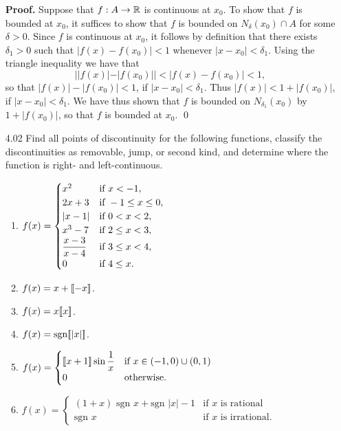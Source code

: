 \begin{enumerate}
      \textbf{Proof.} Suppose that $f : A \rightarrow \mathbb{R}$ is continuous at
      $x_0$. To show that $f$ is bounded at $x_0$, it suffices to show that
      $f$ is bounded on $N_{\delta}(x_0) \cap A$ for some $\delta > 0$. Since
      $f$ is continuous at $x_0$, it follows by definition that there exists
      $\delta_1 > 0$ such that $|f(x) - f(x_0)| < 1$ whenever
      $|x - x_0| < \delta_1$. Using the triangle inequality we have that
      $$||f(x)| - |f(x_0)|| < |f(x) - f(x_0)| < 1,$$
      so that $|f(x)| - |f(x_0)| < 1$, if $|x - x_0| < \delta_1$. Thus
      $|f(x)| < 1 + |f(x_0)|$, if $|x - x_0| < \delta_1$. We have thus shown
      that $f$ is bounded on $N_{\delta_1}(x_0)$ by $1 + |f(x_0)|$, so that
      $f$ is bounded at $x_0$. \qed
   \item[4.02] Find all points of discontinuity for the following functions,
               classify the discontinuities as removable, jump, or second kind,
               and determine where the function is right- and left-continuous.
               \begin{enumerate}
                  \item $f(x) = \begin{cases}
                           x^2                 & \text{if } x < -1, \\
                           2x + 3              & \text{if } -1 \le x \le 0,\\
                           |x - 1|             & \text{if } 0 < x < 2, \\
                           x^3 - 7             & \text{if } 2 \le x < 3, \\
                         \displaystyle\frac{x - 3}{x - 4} & \text{if } 3 \le x < 4, \\
                           0                   & \text{if } 4 \le x.
                        \end{cases}$
                  \item $f(x) = x + \lbrack\!\lbrack -x \rbrack\!\rbrack$.
                  \item $f(x) = x \lbrack\!\lbrack x \rbrack\!\rbrack$.
                  \item $f(x) = \text{sgn}\lbrack\!\lbrack |x| \rbrack\!\rbrack$.
                  \item $f(x) = \begin{cases}
                           \lbrack\!\lbrack x + 1 \rbrack\!\rbrack\displaystyle\sin\frac{1}{x}
                              & \text{if } x \in (-1, 0) \cup (0, 1) \\
                           0  & \text{otherwise}.
                        \end{cases}$
                  \item $f(x) = \begin{cases}
                           (1 + x)\text{ sgn }x + \text{sgn }|x| - 1
                              & \text{if } x \text{ is rational} \\
                           \text{sgn } x  & \text{if }x \text{ is irrational}.
                        \end{cases}$
               \end{enumerate}
               

\end{enumerate}
